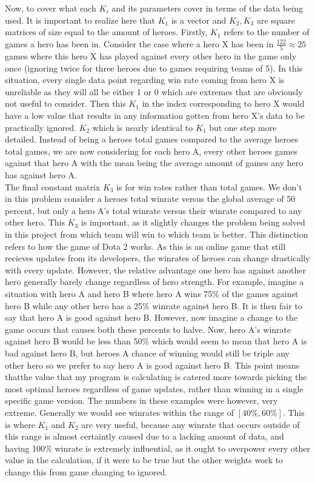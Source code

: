 \documentclass{article}
\begin{document}
Now, to cover what each $K_i$ and its parameters cover in terms of the data being used. It is important to realize here that $K_1$ is a vector and $K_2,K_3$ are square matrices of size equal to the amount of heroes. Firstly, $K_1$ refers to the number of games a hero has been in. Consider the case where a hero X has been in $\frac{122}{5} \approx 25$ games where this hero X has played against every other hero in the game only once (ignoring twice for three heroes due to games requiring teams of 5). In this situation, every single data point regarding win rate coming from hero X is unreliable as they will all be either 1 or 0 which are extremes that are obviously not useful to consider. Then this $K_1$ in the index corresponding to hero X would have a low value that results in any information gotten from hero X's data to be practically ignored. $K_2$ which is nearly identical to $K_1$ but one step more detailed. Instead of being a heroes total games compared to the average heroes total games, we are now considering for each hero A, every other heroes games against that hero A with the mean being the average amount of games any hero has against hero A. \\

The final constant matrix $K_3$ is for win rates rather than total games. We don't in this problem consider a heroes total winrate versus the global average of 50 percent, but only a hero A's total winrate versus their winrate compared to any other hero. This $K_3$ is important, as it slightly changes the problem being solved in this project from which team will win to which team is better. This distinction refers to how the game of Dota 2 works. As this is an online game that still recieves updates from its developers, the winrates of heroes can change drastically with every update. However, the relative advantage one hero has against another hero generally barely change regardless of hero strength. For example, imagine a situation with hero A and hero B where hero A wins 75$\%$ of the games against hero B while any other hero has a 25$\%$ winrate against hero B. It is then fair to say that hero A is good against hero B. However, now imagine a change to the game occurs that causes both these percents to halve. Now, hero A's winrate against hero B would be less than 50$\%$ which would seem to mean that hero A is bad against hero B, but heroes A chance of winning would still be triple any other hero so we prefer to say hero A is good against hero B. This point means thatthe value that my program is calculating is catered more towards picking the most optimal heroes regardless of game updates, rather than winning in a single specific game version. The numbers in these examples were however, very extreme. Generally we would see winrates within the range of $[40\%,60\%]$. This is where $K_1$ and $K_2$ are very useful, because any winrate that occurs outside of this range is almost certaintly caused due to a lacking amount of data, and having 100$\%$ winrate is extremely influential, as it ought to overpower every other value in the calculation, if it were to be true but the other weights work to change this from game changing to ignored. \\
\end{document}
